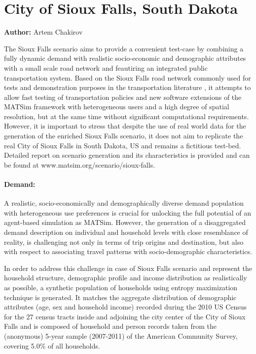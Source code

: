 \section{City of Sioux Falls, South Dakota}
\label{ch:scenarios:siouxfalls}
\hfill \textbf{Author:} Artem Chakirov

The Sioux Falls scenario aims to provide a convenient test-case by combining a fully dynamic demand with realistic socio-economic and demographic attributes with a small scale road network and feautiring an integrated public transportation system. Based on the Sioux Falls road network commonly used for tests and demonstration purposes in the transportation literature \citep[][]{BarGera_TNTP_Webpage_2013}, it attempts to allow fast testing  of transportation policies and new software extensions of the MATSim framework with heterogeneous users and a high degree of spatial resolution, but at the same time without significant computational requirements. However, it is important to stress that despite the use of real world data for the generation of the enriched Sioux Falls scenario, it does not aim to replicate the real City of Sioux Falls in South Dakota, US and remains a fictitious test-bed. Detailed report on scenario generation and its characteristics is provided \citet[][]{ChakirovFourie_TechRep_FCL_2014} and can be found at www.matsim.org/scenario/sioux-falls. 

\paragraph{Demand:}

A realistic, socio-economically and demographically diverse demand population with  heterogeneous use preferences is crucial for unlocking the full potential of an agent-based simulation as MATSim. However, the generation of a disaggregated demand description on individual and household levels with close resemblance of reality, is challenging not only in terms of trip origins and destination, but also with respect to associating travel patterns with socio-demographic characteristics.

In order to address this challenge in case of Sioux Falls scenario and represent the household structure, demographic profile and income distribution as realistically as possible, a synthetic population of households using entropy maximization technique is generated. It matches the aggregate distribution of demographic attributes (age, sex and household income) recorded during the 2010 US Census for the 27 census tracts inside and adjoining the city center of the City of Sioux Falls and is composed of household and person records taken from the (anonymous) 5-year sample (2007-2011) of the American Community Survey, covering 5.0\% of all households.


